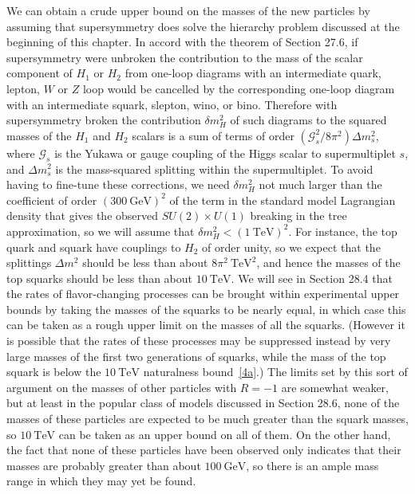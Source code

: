 We can obtain a crude upper bound on the masses of the new particles by
assuming that supersymmetry does solve the hierarchy problem discussed
at the beginning of this chapter. In accord with the theorem of Section
27.6, if supersymmetry were unbroken the contribution to the mass of the
scalar component of \(H_1\) or \(H_2\) from one-loop diagrams with an
intermediate quark, lepton, \(W\) or \(Z\) loop would be cancelled by
the corresponding one-loop diagram with an intermediate squark,
slepton, wino, or bino. Therefore with supersymmetry broken the
contribution \(\delta m_H^2\) of such diagrams to the squared masses of
the \(H_1\) and \(H_2\) scalars is a sum of terms of order
\((\mathcal{G}_s^2/8\pi^2)\Delta m_s^2\), where \(\mathcal{G}_s\) is the
Yukawa or gauge coupling of the Higgs scalar to supermultiplet \(s\),
and \(\Delta m_s^2\) is the mass-squared splitting within the
supermultiplet. To avoid having to fine-tune these corrections, we need
\(\delta m_H^2\) not much larger than the coefficient of order
\((300\ \mathrm{GeV})^2\) of the term in the standard model Lagrangian
density that gives the observed \(SU(2)\times U(1)\) breaking
in the tree approximation, so we will assume that
\(\delta m_H^2<(1\ \mathrm{TeV})^2\). For instance, the top quark and
squark have couplings to \(H_2\) of order unity, so we expect that the
splittings \(\Delta m^2\) should be less than about
\(8\pi^2\ \mathrm{TeV}^2\), and hence the masses of the top squarks
should be less than about \(10\ \mathrm{TeV}\). We will see in Section
28.4 that the rates of flavor-changing processes can be brought within
experimental upper bounds by taking the masses of the squarks to be
nearly equal, in which case this can be taken as a rough upper limit on
the masses of all the squarks. (However it is possible that the rates of
these processes may be suppressed instead by very large masses of the
first two generations of squarks, while the mass of the top squark is
below the \(10\ \mathrm{TeV}\) naturalness
bound~\hyperref[ch28-ref-4a]{[4a]}.) The limits set by this sort of
argument on the masses of other particles with \(R=-1\) are somewhat
weaker, but at least in the popular class of models discussed in Section
28.6, none of the masses of these particles are expected to be much
greater than the squark masses, so \(10\ \mathrm{TeV}\) can be taken as
an upper bound on all of them. On the other hand, the fact that none of
these particles have been observed only indicates that their masses are
probably greater than about \(100\ \mathrm{GeV}\), so there is an ample
mass range in which they may yet be found.

